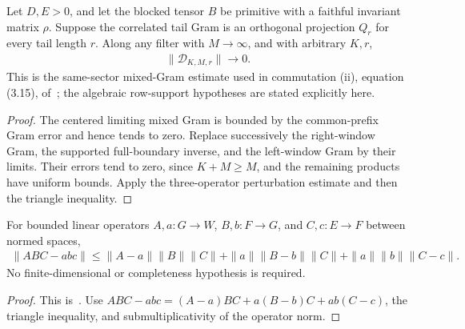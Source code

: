 \begin{lemma}
    \label{thm:residual_window_mixed_gram_decay}
    \leanok
    Let $D,E>0$, and let the blocked tensor $B$ be primitive with a faithful
    invariant matrix $\rho$. Suppose the correlated tail Gram is an orthogonal
    projection $Q_r$ for every tail length $r$.
    Along any filter with $M\to\infty$, and with arbitrary $K,r$,
    \begin{align}
        \|\mathcal D_{K,M,r}\|\longrightarrow0.
    \end{align}
    This is the same-sector mixed-Gram estimate used in commutation (ii),
    equation (3.15), of~\cite{Nachtergaele1996Spectral}; the algebraic
    row-support hypotheses are stated explicitly here.
\end{lemma}
\begin{proof}\leanok
    The centered limiting mixed Gram is bounded by the common-prefix Gram error
    and hence tends to zero. Replace successively the right-window Gram, the
    supported full-boundary inverse, and the left-window Gram by their limits.
    Their errors tend to zero, since $K+M\ge M$, and the remaining products have
    uniform bounds. Apply the three-operator perturbation estimate and then
    the triangle inequality.
\end{proof}

\begin{lemma}
    \label{thm:three_operator_perturbation}
    \leanok
    For bounded linear operators $A,a:G\to W$, $B,b:F\to G$, and
    $C,c:E\to F$ between normed spaces,
    \begin{align}
        \|ABC-abc\|\le
        \|A-a\|\|B\|\|C\|+
        \|a\|\|B-b\|\|C\|+
        \|a\|\|b\|\|C-c\|.
    \end{align}
    No finite-dimensional or completeness hypothesis is required.
\end{lemma}
\begin{proof}\leanok
    This is~\cite[``Three-operator perturbation
        estimate'']{QICLean2026Blueprint}.
    Use $ABC-abc=(A-a)BC+a(B-b)C+ab(C-c)$, the triangle inequality,
    and submultiplicativity of the operator norm.
\end{proof}

